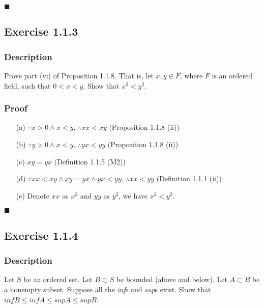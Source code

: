 \documentclass[12pt, letterpaper, oneside]{book}
\begin{document}
$\blacksquare$

\subsection{Exercise 1.1.3}

\subsubsection{Description}

Prove part (vi) of Proposition 1.1.8. That is, let $x, y \in F$, where $F$ is an ordered field, such that $0 < x < y$.
Show that $x^2 < y^2$.

\subsubsection{Proof}

\begin{enumerate}
  \item[(a)] $\because x > 0 \land x < y$, $\therefore xx < xy$ (Proposition 1.1.8 (ii))
  \item[(b)] $\because y > 0 \land x < y$, $\therefore yx < yy$ (Proposition 1.1.8 (ii))
  \item[(c)] $xy = yx$ (Definition 1.1.5 (M2))
  \item[(d)] $\because xx < xy \land xy = yx \land yx < yy$, $\therefore xx < yy$ (Definition 1.1.1 (ii))
  \item[(e)] Denote $xx$ as $x^2$ and $yy$ as $y^2$, we have $x^2 < y^2$.
\end{enumerate}

$\blacksquare$

\subsection{Exercise 1.1.4}

\subsubsection{Description}

Let $S$ be an ordered set. Let $B \subset S$ be bounded (above and below). Let $A \subset B$ be a nonempty subset.
Suppose all the \textit{inf}s and \textit{sup}s exist. Show that $inf B \le inf A \le sup A \le sup B$.
\end{document}
